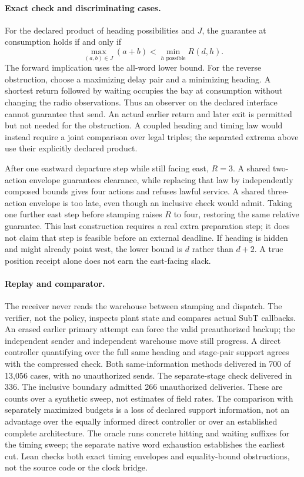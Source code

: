 \documentclass{article}
\begin{document}
\paragraph{Exact check and discriminating cases.}
For the declared product of heading possibilities and $J$, the guarantee
at consumption holds if and only if
\[
  \max_{(a,b)\in J}(a+b)<\min_{h\text{ possible}}R(d,h).
\]
The forward implication uses the all-word lower bound. For the reverse
obstruction, choose a maximizing delay pair and a minimizing heading.
A shortest return followed by waiting occupies the bay at consumption
without changing the radio observations. Thus an observer on the declared
interface cannot guarantee that send. An actual earlier return and later
exit is permitted but not needed for the obstruction. A coupled heading
and timing law would instead require a joint comparison over legal triples;
the separated extrema above use their explicitly declared product.

After one eastward departure step while still facing east, $R=3$.
A shared two-action envelope guarantees clearance, while replacing that
law by independently composed bounds gives four actions and refuses
lawful service. A shared three-action envelope is too late, even though
an inclusive check would admit. Taking one further east step before
stamping raises $R$ to four, restoring the same relative guarantee.
This last construction requires a real extra preparation step; it does
not claim that step is feasible before an external deadline. If heading is
hidden and might already point west, the lower bound is $d$ rather than
$d+2$. A true position receipt alone does not earn the east-facing slack.

\paragraph{Replay and comparator.}
The receiver never reads the warehouse between stamping and dispatch.
The verifier, not the policy, inspects plant state and compares actual
SubT callbacks. An erased earlier primary attempt can force the valid
preauthorized backup; the independent sender and independent warehouse
move still progress. A direct controller quantifying over the full same
heading and stage-pair support agrees with the compressed check.
Both same-information methods delivered in 700 of 13,056 cases, with
no unauthorized sends. The separate-stage check delivered in 336. The
inclusive boundary admitted 266 unauthorized deliveries. These are
counts over a synthetic sweep, not estimates of field rates. The
comparison with separately maximized budgets is a loss of declared
support information, not an advantage over the equally informed direct
controller or over an established complete architecture. The oracle
runs concrete hitting and waiting suffixes for the timing sweep; the
separate native word exhaustion establishes the earliest cut. Lean
checks both exact timing envelopes and equality-bound obstructions,
not the source code or the clock bridge.
\end{document}
